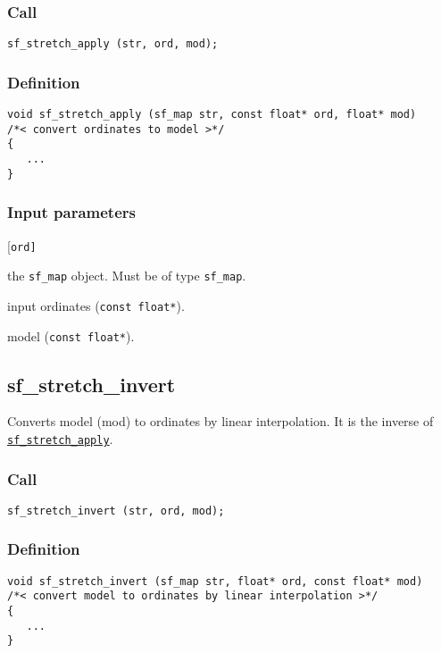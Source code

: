 \subsubsection*{Call}
\begin{verbatim}sf_stretch_apply (str, ord, mod);\end{verbatim}

\subsubsection*{Definition}
\begin{verbatim}
void sf_stretch_apply (sf_map str, const float* ord, float* mod)
/*< convert ordinates to model >*/
{
   ...
}
\end{verbatim}

\subsubsection*{Input parameters}
\begin{desclist}{\tt }{\quad}[\tt ord]
   \setlength\itemsep{0pt}
   \item[str] the \texttt{sf\_map} object. Must be of type \texttt{sf\_map}. 
   \item[ord] input ordinates (\texttt{const float*}).
   \item[mod] model (\texttt{const float*}).
\end{desclist}




\subsection{{sf\_stretch\_invert}}
Converts model (mod) to ordinates by linear interpolation. It is the inverse of \hyperref[sec:sf_stretch_apply]{\texttt{sf\_stretch\_apply}}.

\subsubsection*{Call}
\begin{verbatim}sf_stretch_invert (str, ord, mod);\end{verbatim}

\subsubsection*{Definition}
\begin{verbatim}
void sf_stretch_invert (sf_map str, float* ord, const float* mod)
/*< convert model to ordinates by linear interpolation >*/
{
   ...
}
\end{verbatim}

